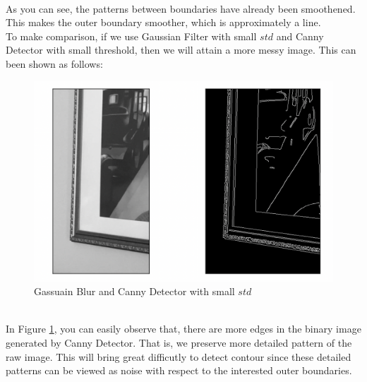 \documentclass{article}
\begin{document}
\\
As you can see, the patterns between boundaries have already been smoothened. This makes the outer boundary smoother, which is approximately a line.
\vspace{4pt}
\\
To make comparison, if we use Gaussian Filter with small $std$ and Canny Detector with small threshold, then we will attain a more messy image. This can been shown as follows:
\begin{figure}[h]
	\centering
	\includegraphics[width=.4\textheight]{fig3.png}
	\caption{Gassuain Blur and Canny Detector with small $std$}
	\label{fig:003}
\end{figure}
\\
In Figure \ref{fig:003}, you can easily observe that, there are more edges in the binary image generated by Canny Detector. That is, we preserve more detailed pattern of the raw image. This will bring great difficutly to detect contour since these detailed patterns can be viewed as noise with respect to the interested outer boundaries.
\newpage
\end{document}
